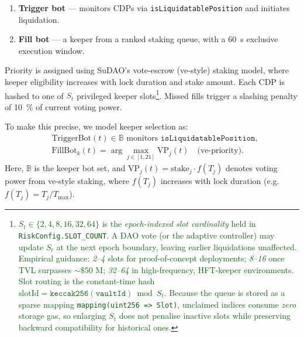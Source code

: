 \documentclass[11pt]{article}
\begin{document}
\begin{enumerate}[label=\textbf{\arabic*.},wide, labelindent=0pt]
  \item \textbf{Trigger bot} — monitors CDPs via \texttt{isLiquidatablePosition} and initiates liquidation.
  \item \textbf{Fill bot} — a keeper from a ranked staking queue, with a \SI{60}{\second} exclusive execution window.
\end{enumerate}

Priority is assigned using SuDAO's vote-escrow (ve-style) staking model, where keeper eligibility increases with lock duration and stake amount. 
Each CDP is hashed to one of \textcolor{darkgreen}{$S_{t}$} privileged keeper slots\footnote{\textcolor{darkgreen}{%
\(S_{t}\!\in\!\{2,4,8,16,32,64\}\) is the \emph{epoch-indexed slot cardinality} held in \texttt{RiskConfig.SLOT\_COUNT}.  
A DAO vote (or the adaptive controller) may update \(S_{t}\) at the next epoch boundary, leaving earlier liquidations unaffected. Empirical guidance: \emph{2–4} slots for proof-of-concept deployments; \emph{8–16} once TVL surpasses \(\sim\$50\) M; \emph{32–64} in high-frequency, HFT-keeper environments.  Slot routing is the constant-time hash  
\(\mathrm{slotId}=\mathtt{keccak256(vaultId)}\bmod S_{t}\).  
Because the queue is stored as a sparse mapping \texttt{mapping(uint256~=>~Slot)}, unclaimed indices consume \emph{zero} storage gas, so enlarging \(S_{t}\) does not penalise inactive slots while preserving backward compatibility for historical ones.}}. Missed fills trigger a slashing penalty of \SI{10}{\percent} of current voting power.

\medskip

To make this precise, we model keeper selection as:
\begin{align*}
&\text{TriggerBot}(t) \in \mathbb{B} \text{ monitors } \texttt{isLiquidatablePosition}, \\
&\text{FillBot}_k(t) = \arg\max_{j \in[1,21]} \text{VP}_j(t) \quad \text{(ve-priority)}.
\end{align*}
Here, \( \mathbb{B} \) is the keeper bot set, and \( \text{VP}_j(t) = \text{stake}_j \cdot f(T_j) \) denotes voting power from ve-style staking, where \( f(T_j) \) increases with lock duration (e.g. \( f(T_j) = T_j / T_{\max} \)).
\end{document}
